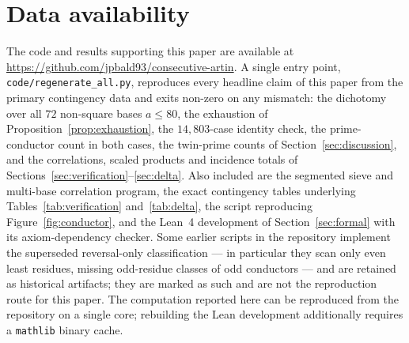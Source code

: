 \documentclass[11pt,reqno]{amsart}
\theoremstyle{plain}
\theoremstyle{definition}
\begin{document}
\section*{Data availability}
The code and results supporting this paper are available at
\url{https://github.com/jpbald93/consecutive-artin}. A single entry point,
\texttt{code/regenerate\_all.py}, reproduces every headline claim of this
paper from the primary contingency data and exits non-zero on any mismatch:
the dichotomy over all $72$ non-square bases $a \le 80$, the exhaustion of
Proposition~\ref{prop:exhaustion}, the $14{,}803$-case identity check, the
prime-conductor count in both cases, the twin-prime counts of
Section~\ref{sec:discussion}, and the correlations, scaled products and
incidence totals of Sections~\ref{sec:verification}--\ref{sec:delta}. Also
included are the segmented sieve and multi-base correlation program, the exact
contingency tables underlying Tables~\ref{tab:verification}
and~\ref{tab:delta}, the script reproducing Figure~\ref{fig:conductor}, and
the Lean~4 development of Section~\ref{sec:formal} with its axiom-dependency
checker. Some earlier scripts in the repository implement the superseded
reversal-only classification --- in particular they scan only even least
residues, missing odd-residue classes of odd conductors --- and are retained
as historical artifacts; they are marked as such and are not the reproduction
route for this paper. The computation reported here can be reproduced from the
repository on a single core; rebuilding the Lean development
additionally requires a \texttt{mathlib} binary cache.
\end{document}
